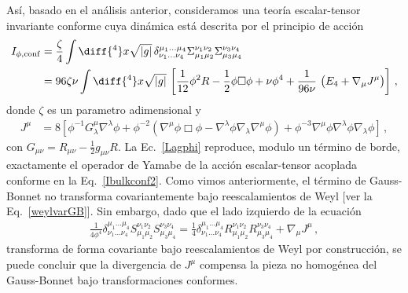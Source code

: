 \documentclass[../Main.tex]{subfiles}
\begin{document}
Así, basado en el análisis anterior, consideramos una teoría escalar-tensor invariante conforme cuya dinámica está descrita por el principio de acción
\begin{align}\notag
I_{\phi,\rm conf} &= \frac{\zeta}{4}\int\diff{^4}x\sqrt{|g|}\,\delta^{\mu_1\ldots\mu_4}_{\nu_1\ldots\nu_4}\Sigma^{\nu_1\nu_2}_{\mu_1\mu_2}\Sigma^{\nu_3\nu_4}_{\mu_3\mu_4} \\
&= 96\zeta\nu\int\diff{^4}x\sqrt{|g|}\,\left[\frac{1}{12}\phi^2 R - \frac{1}{2}\phi\Box\phi + \nu\phi^4 + \frac{1}{96\nu}\,\left(E_4 + \nabla_\mu J^\mu\right)\right] \label{Lagphi}  \,,
\end{align}
donde $\zeta$ es un parametro adimensional y
\begin{align}
J^{\mu} &= 8 \left[\phi^{-1} G^\mu_\lambda\nabla^\lambda\phi+ \phi^{-2} \left(\nabla^{\mu} \phi \Box \phi -\nabla^{\lambda} \phi\nabla_{\lambda}\nabla^{\mu} \phi \right) + \phi^{-3} \nabla^{\mu} \phi \nabla^{\lambda} \phi \nabla_{\lambda} \phi \right]\,,
\end{align}
con $G_{\mu\nu}=R_{\mu\nu} - \frac{1}{2}g_{\mu\nu}R$. La Ec.~\eqref{Lagphi} reproduce, modulo un término de borde, exactamente el operador de Yamabe de la acción escalar-tensor acoplada conforme en la Eq.~\eqref{Ibulkconf2}. %
Como vimos anteriormente, el término de Gauss-Bonnet no transforma covariantemente bajo reescalamientos de Weyl [ver la Eq.~\eqref{weylvarGB}]. Sin embargo, dado que el lado izquierdo de la ecuación 
\begin{align}\label{GBS}
    \frac{1}{4\phi^4}\delta^{\mu_1\ldots\mu_4}_{\nu_1\ldots\nu_4}S^{\nu_1\nu_2}_{\mu_1\mu_2}S^{\nu_3\nu_4}_{\mu_3\mu_4} = \frac{1}{4}\delta^{\mu_1\ldots\mu_4}_{\nu_1\ldots\nu_4}R^{\nu_1\nu_2}_{\mu_1\mu_2}R^{\nu_3\nu_4}_{\mu_3\mu_4} + \nabla_\mu J^\mu\,,
\end{align}
transforma de forma covariante bajo reescalamientos de Weyl por construcción, se puede concluir que la divergencia de $J^\mu$ compensa la pieza no homogénea del Gauss-Bonnet bajo transformaciones conformes. 
\end{document}
